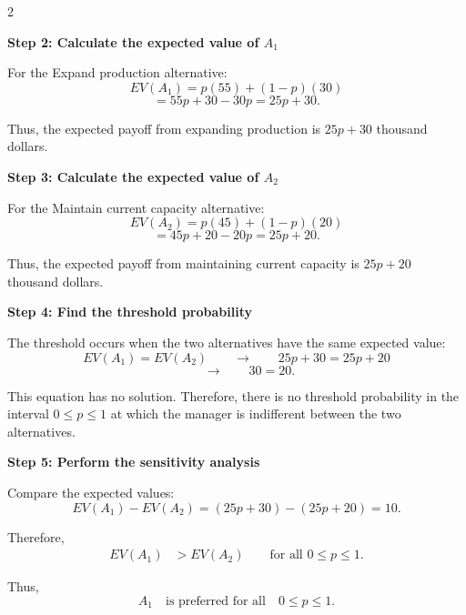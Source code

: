 	\vspace{-3mm}
	
	\noindent
	\setlength{\columnseprule}{0.4pt} 
	\begin{multicols}{2}
		\vspace{0pt}
		
		\textbf{Step 2: Calculate the expected value of $A_1$}
		
		For the Expand production alternative:
		\[
		EV(A_1)
		=
		p(55)
		+
		(1-p)(30)
		\]
		\[
		=
		55p+30-30p
		=
		25p+30.
		\]
		
		Thus, the expected payoff from expanding production is
		$25p+30$ thousand dollars.
		
		\columnbreak
		
		\textbf{Step 3: Calculate the expected value of $A_2$}
		
		For the Maintain current capacity alternative:
		\[
		EV(A_2)
		=
		p(45)
		+
		(1-p)(20)
		\]
		\[
		=
		45p+20-20p
		=
		25p+20.
		\]
		
		Thus, the expected payoff from maintaining current capacity is
		$25p+20$ thousand dollars.
		
	\end{multicols}
	
	
	\setlength{\columnseprule}{0pt}
	
	\textbf{Step 4: Find the threshold probability}
	
	The threshold occurs when the two alternatives have the same expected
	value:
	\[
	EV(A_1)=EV(A_2)
	\qquad \longrightarrow \qquad
	25p+30=25p+20
	\]
	\[
	\qquad \longrightarrow \qquad
	30=20.
	\]
	
	This equation has no solution. Therefore, there is no threshold probability
	in the interval $0\leq p\leq1$ at which the manager is indifferent between
	the two alternatives.
	
	\textbf{Step 5: Perform the sensitivity analysis}
	
	Compare the expected values:
	\[
	EV(A_1)-EV(A_2)
	=
	(25p+30)-(25p+20)
	=
	10.
	\]
	
	Therefore,
	\[
	\begin{aligned}
		EV(A_1)&>EV(A_2)
		\qquad \text{for all }0\leq p\leq1.
	\end{aligned}
	\]
	
	Thus,
	\[
	\boxed{
		A_1
		\quad\text{is preferred for all}\quad
		0\leq p\leq1.
	}
	\]
	

